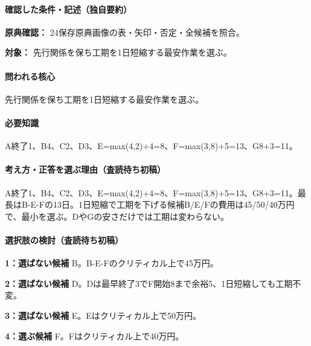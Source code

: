 \paragraph{確認した条件・記述（独自要約）}\mbox{}\par

\noindent\textbf{原典確認：} 24保存原典画像の表・矢印・否定・全候補を照合。\par

\noindent\textbf{対象：} 先行関係を保ち工期を1日短縮する最安作業を選ぶ。\par

\paragraph{問われる核心} 先行関係を保ち工期を1日短縮する最安作業を選ぶ。

\paragraph{必要知識} A終了1、B4、C2、D3、E=\allowbreak{}max(4,2)+4=\allowbreak{}8、F=\allowbreak{}max(3,8)+5=\allowbreak{}13、G8+3=\allowbreak{}11。

\paragraph{考え方・正答を選ぶ理由（査読待ち初稿）} A終了1、B4、C2、D3、E=\allowbreak{}max(4,2)+4=\allowbreak{}8、F=\allowbreak{}max(3,8)+5=\allowbreak{}13、G8+3=\allowbreak{}11。最長はB-E-Fの13日。1日短縮で工期を下げる候補B/E/Fの費用は45/50/40万円で、最小を選ぶ。DやGの安さだけでは工期は変わらない。

\paragraph{選択肢の検討（査読待ち初稿）}\mbox{}\par

\noindent\textbf{1：選ばない候補} B。B-E-Fのクリティカル上で45万円。\par

\noindent\textbf{2：選ばない候補} D。Dは最早終了3でF開始8まで余裕5、1日短縮しても工期不変。\par

\noindent\textbf{3：選ばない候補} E。Eはクリティカル上で50万円。\par

\noindent\textbf{4：選ぶ候補} F。Fはクリティカル上で40万円。\par

